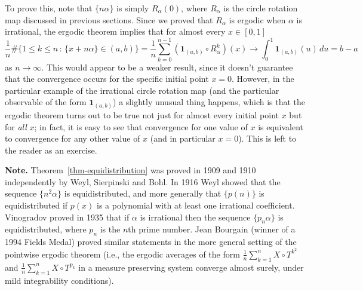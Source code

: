 \documentclass[12pt]{article}
\newcommand{\ind}{\textbf{1}}
\theoremstyle{example}
\begin{document}
\begin{enumerate}
To prove this, note that $\{ n\alpha \}$ is simply $R_\alpha(0)$, where $R_\alpha$ is the circle rotation map discussed in previous sections. Since we proved that $R_\alpha$ is ergodic when $\alpha$ is irrational, the ergodic theorem implies that for almost every $x\in[0,1]$
$$
\frac{1}{n} \# \Big\{ 1\le k\le n\,:\, \{x+n\alpha\}\in (a,b) \Big\} 
= \frac{1}{n} \sum_{k=0}^{n-1} \left(\ind_{(a,b)}\circ R_\alpha^k\right) (x) 
\to \int_0^1 \ind_{(a,b)}(u)\,du = b-a
$$
as $n\to\infty$. This would appear to be a weaker result, since it doesn't guarantee that the convergence occurs for the specific initial point $x=0$. However, in the particular example of the irrational circle rotation map (and the particular observable of the form $\ind_{(a,b)}$) a slightly unusual thing happens, which is that the ergodic theorem turns out to be true not just for almost every initial point $x$ but for \emph{all} $x$; in fact, it is easy to see that convergence for one value of $x$ is equivalent to convergence for any other value of $x$ (and in particular $x=0$). This is left to the reader as an exercise.

\textbf{Note.} Theorem~\ref{thm-equidistribution} was proved in 1909 and 1910 independently by Weyl, Sierpinski and Bohl. In 1916 Weyl showed that the sequence $\{ n^2 \alpha \}$ is equidistributed, and more generally that $\{ p(n) \}$ is equidistributed if $p(x)$ is a polynomial with at least one irrational coefficient. Vinogradov proved in 1935 that if $\alpha$ is irrational then the sequence $\{ p_n \alpha \}$ is equidistributed, where $p_n$ is the $n$th prime number. Jean Bourgain (winner of a 1994 Fields Medal) proved similar statements in the more general setting of the pointwise ergodic theorem (i.e., the ergodic averages of the form $\frac{1}{n}\sum_{k=1}^n X\circ T^{k^2}$ and $\frac{1}{n}\sum_{k=1}^n X\circ T^{p_k}$ in a measure preserving system converge almost surely, under mild integrability conditions).


\end{enumerate}
\end{document}
